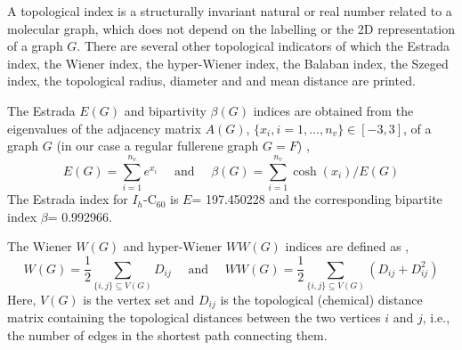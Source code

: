 \documentclass[article,a4paper,twoside]{memoir}
\newcommand{\C}[1]{\ensuremath{\mathrm{C}_{#1}}}
\begin{document}
A topological index is a structurally invariant natural or real number related to
a molecular graph, which does not depend on the labelling or the 2D representation
of a graph $G$.  There are several other topological indicators \cite{Cataldo,Caporossi}
of which the Estrada index, the Wiener index, the hyper-Wiener index, the Balaban
index, the Szeged index, the topological radius, diameter and and mean distance are
printed.

The Estrada $E(G)$ and bipartivity $\beta(G)$ indices are obtained from
the eigenvalues of the adjacency matrix $A(G)$, $\{ x_i, i=1,\ldots,n_v \} \in [-3,3]$,
of a graph $G$ (in our case a regular fullerene graph $G=F$) \cite{Estrada,Doslic2005},
\begin{equation}
  \label{Estrada}
  E(G)=\sum_{i=1}^{n_v}e^{x_i} \quad \text{ and } \quad \beta(G)=\sum_{i=1}^{n_v}\cosh(x_i)/E(G)
\end{equation}
The Estrada index for $I_h$-\C{60} is $E$= 197.450228 and the corresponding bipartite index $\beta$= 0.992966.

The Wiener $W(G)$ and hyper-Wiener $WW(G)$ indices are defined as \cite{Wiener1947},
\begin{equation}
  \label{Wiener}
  W(G)=\frac{1}{2} \sum_{\{ i,j \} \subseteq V(G)} D_{ij} \quad \text{ and } \quad WW(G)=\frac{1}{2} \sum_{\{ i,j \} \subseteq V(G)} \left( D_{ij} + D_{ij}^2 \right)
\end{equation}
Here, $V(G)$ is the vertex set and $D_{ij}$ is the topological (chemical) distance
matrix containing the topological distances between the two vertices $i$ and $j$,
i.e., the number of edges in the shortest path connecting them. 
\end{document}
